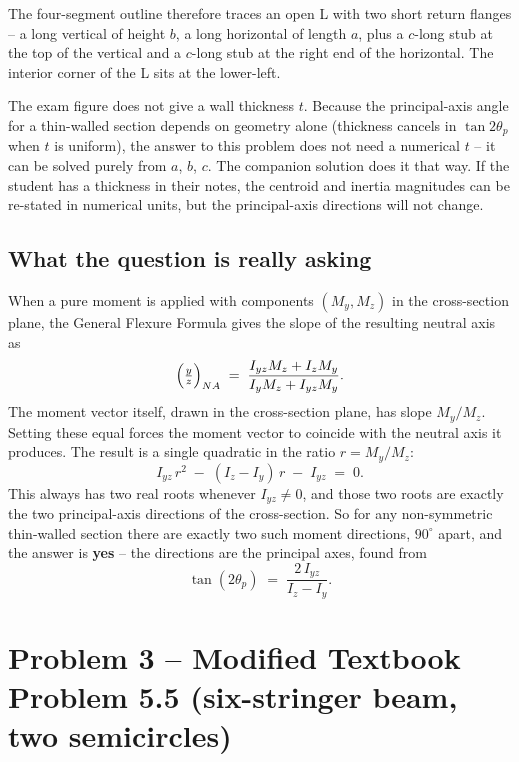 \documentclass[11pt]{article}
\begin{document}
The four-segment outline therefore traces an open L with two short return flanges -- a long vertical of height $b$, a long horizontal of length $a$, plus a $c$-long stub at the top of the vertical and a $c$-long stub at the right end of the horizontal. The interior corner of the L sits at the lower-left.

\begin{verifybox}
The exam figure does not give a wall thickness $t$. Because the principal-axis angle for a thin-walled section depends on geometry alone (thickness cancels in $\tan 2\theta_p$ when $t$ is uniform), the answer to this problem does not need a numerical $t$ -- it can be solved purely from $a$, $b$, $c$. The companion solution does it that way. If the student has a thickness in their notes, the centroid and inertia magnitudes can be re-stated in numerical units, but the principal-axis directions will not change.
\end{verifybox}

\subsection*{What the question is really asking}

When a pure moment is applied with components $(M_y, M_z)$ in the cross-section plane, the General Flexure Formula gives the slope of the resulting neutral axis as
$$\Bigl(\tfrac{y}{z}\Bigr)_{NA} \;=\; \frac{I_{yz} M_z + I_z M_y}{I_y M_z + I_{yz} M_y}.$$
The moment vector itself, drawn in the cross-section plane, has slope $M_y / M_z$. Setting these equal forces the moment vector to coincide with the neutral axis it produces. The result is a single quadratic in the ratio $r = M_y/M_z$:
$$I_{yz}\, r^2 \;-\; (I_z - I_y)\, r \;-\; I_{yz} \;=\; 0.$$
This always has two real roots whenever $I_{yz} \neq 0$, and those two roots are exactly the two principal-axis directions of the cross-section. So for any non-symmetric thin-walled section there are exactly two such moment directions, $90^\circ$ apart, and the answer is \textbf{yes} -- the directions are the principal axes, found from
$$\tan(2\theta_p) \;=\; \frac{2\,I_{yz}}{I_z - I_y}.$$

\section*{Problem 3 -- Modified Textbook Problem 5.5 (six-stringer beam, two semicircles)}
\end{document}
